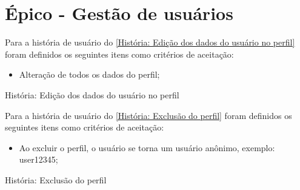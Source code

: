 \section{Épico - Gestão de usuários}
\label{outro_gestão_usuarios}

Para a história de usuário do \autoref{História: Edição dos dados do usuário no perfil} foram definidos os seguintes itens como critérios de aceitação:

\begin{itemize}
\item Alteração de todos os dados do perfil;
\end{itemize}

\def\arraystretch{2}
\begin{quadro}[htb]
\centering
\ABNTEXfontereduzida
\caption[História: Edição dos dados do usuário no perfil]{História: Edição dos dados do usuário no perfil}
\label{História: Edição dos dados do usuário no perfil}
\end{quadro}
\FloatBarrier 

Para a história de usuário do \autoref{História: Exclusão do perfil} foram definidos os seguintes itens como critérios de aceitação:

\begin{itemize}
\item Ao excluir o perfil, o usuário se torna um usuário anônimo, exemplo: user12345;
\end{itemize}

\def\arraystretch{2}
\begin{quadro}[htb]
\centering
\ABNTEXfontereduzida
\caption[História: Exclusão do perfil]{História: Exclusão do perfil}
\label{História: Exclusão do perfil}
\end{quadro}
\FloatBarrier 

